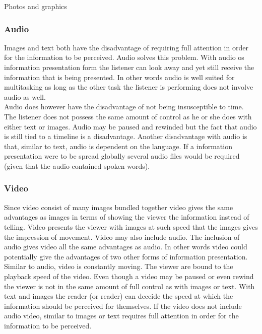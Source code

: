 Photos and graphics


\subsubsection{Audio}
Images and text both have the disadvantage of requiring full attention in order for the information to be perceived. Audio solves this problem. With audio os information presentation form the listener can look away and yet still receive the information that is being presented. In other words audio is well suited for multitasking as long as the other task the listener is performing does not involve audio as well.\\

Audio does however have the disadvantage of not being insusceptible to time. The listener does not possess the same amount of control as he or she does with either text or images. Audio may be paused and rewinded but the fact that audio is still tied to a timeline is a disadvantage. Another disadvantage with audio is that, similar to text, audio is dependent on the language. If a information presentation were to be spread globally several audio files would be required (given that the audio contained spoken words).

\subsubsection{Video}
Since video consist of many images bundled together video gives the same advantages as images in terms of showing the viewer the information instead of telling. Video presents the viewer with images at such speed that the images gives the impression of movement. Video may also include audio. The inclusion of audio gives video all the same advantages as audio. In other words video could potentially give the advantages of two other forms of information presentation.\\

Similar to audio, video is constantly moving. The viewer are bound to the playback speed of the video. Even though a video may be paused or even rewind the viewer is not in the same amount of full control as with images or text. With text and images the reader (or reader) can deceide the speed at which the information should be perceived for themselves. If the video does not include audio video, similar to images or text requires full attention in order for the information to be perceived.